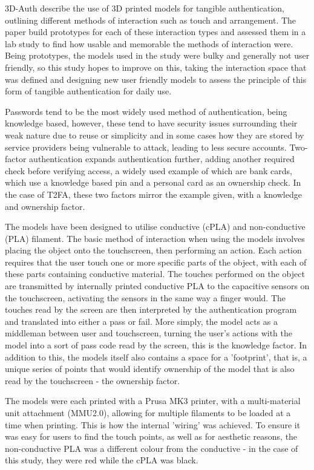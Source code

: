\documentclass{l4proj}
\begin{document}
3D-Auth describe the use of 3D printed models for tangible authentication, outlining different methods of interaction such as touch and arrangement. The paper build prototypes for each of these interaction types and assessed them in a lab study to find how usable and memorable the methods of interaction were. Being prototypes, the models used in the study were bulky and generally not user friendly, so this study hopes to improve on this, taking the interaction space that was defined and designing new user friendly models to assess the principle of this form of tangible authentication for daily use.

Passwords tend to be the most widely used method of authentication, being knowledge based, however, these tend to have security issues surrounding their weak nature due to reuse or simplicity and in some cases how they are stored by service providers being vulnerable to attack, leading to less secure accounts. Two-factor authentication expands authentication further, adding another required check before verifying access, a widely used example of which are bank cards, which use a knowledge based pin and a personal card as an ownership check. In the case of T2FA, these two factors mirror the example given, with a knowledge and ownership factor.

The models have been designed to utilise conductive (cPLA) and non-conductive (PLA) filament. The basic method of interaction when using the models involves placing the object onto the touchscreen, then performing an action. Each action requires that the user touch one or more specific parts of the object, with each of these parts containing conductive material. The touches performed on the object are transmitted by internally printed conductive PLA to the capacitive sensors on the touchscreen, activating the sensors in the same way a finger would. The touches read by the screen are then interpreted by the authentication program and translated into either a pass or fail. More simply, the model acts as a middleman between user and touchscreen, turning the user's actions with the model into a sort of pass code read by the screen, this is the knowledge factor. In addition to this, the models itself also contains a space for a 'footprint', that is, a unique series of points that would identify ownership of the model that is also read by the touchscreen - the ownership factor.

The models were each printed with a Prusa MK3 printer, with a multi-material unit attachment (MMU2.0), allowing for multiple filaments to be loaded at a time when printing. This is how the internal 'wiring' was achieved. To ensure it was easy for users to find the touch points, as well as for aesthetic reasons, the non-conductive PLA was a different colour from the conductive - in the case of this study, they were red while the cPLA was black.
\end{document}
